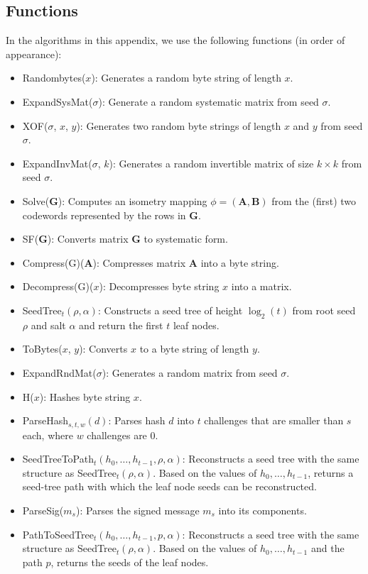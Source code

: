 \subsection{Functions}
In the algorithms in this appendix, we use the following functions (in order of appearance):
\begin{itemize}
  \item Randombytes($x$): Generates a random byte string of length $x$.
  \item ExpandSysMat($\sigma$): Generate a random systematic matrix from seed $\sigma$.
  \item XOF($\sigma$, $x$, $y$): Generates two random byte strings of length $x$ and $y$ from seed $\sigma$.
  \item ExpandInvMat($\sigma$, $k$): Generates a random invertible matrix of size $k \times k$ from seed $\sigma$.
  \item Solve($\textbf{G}$): Computes an isometry mapping $\phi = (\textbf{A}, \textbf{B})$ from the (first) two codewords represented by the rows in $\textbf{G}$.
  \item SF($\textbf{G}$): Converts matrix $\textbf{G}$ to systematic form.
  \item Compress(G)($\textbf{A}$): Compresses matrix $\textbf{A}$ into a byte string.
  \item Decompress(G)($x$): Decompresses byte string $x$ into a matrix.
  \item SeedTree$_t(\rho, \alpha)$: Constructs a seed tree of height $\log_2(t)$ from root seed $\rho$ and salt $\alpha$ and return the first $t$ leaf nodes.
  \item ToBytes($x$, $y$): Converts $x$ to a byte string of length $y$.
  \item ExpandRndMat($\sigma$): Generates a random matrix from seed $\sigma$.
  \item H($x$): Hashes byte string $x$.
  \item ParseHash$_{s,t,w}(d)$: Parses hash $d$ into $t$ challenges that are smaller than $s$ each, where $w$ challenges are 0.
  \item SeedTreeToPath$_t(h_0, \ldots, h_{t-1}, \rho, \alpha)$: Reconstructs a seed tree with the same structure as SeedTree$_t(\rho, \alpha)$. Based on the values of $h_0, \ldots, h_{t-1}$, returns a seed-tree path with which the leaf node seeds can be reconstructed.
  \item ParseSig($m_s$): Parses the signed message $m_s$ into its components.
  \item PathToSeedTree$_t(h_0, \ldots, h_{t-1}, p, \alpha)$: Reconstructs a seed tree with the same structure as SeedTree$_t(\rho, \alpha)$. Based on the values of $h_0, \ldots, h_{t-1}$ and the path $p$, returns the seeds of the leaf nodes.
\end{itemize}

